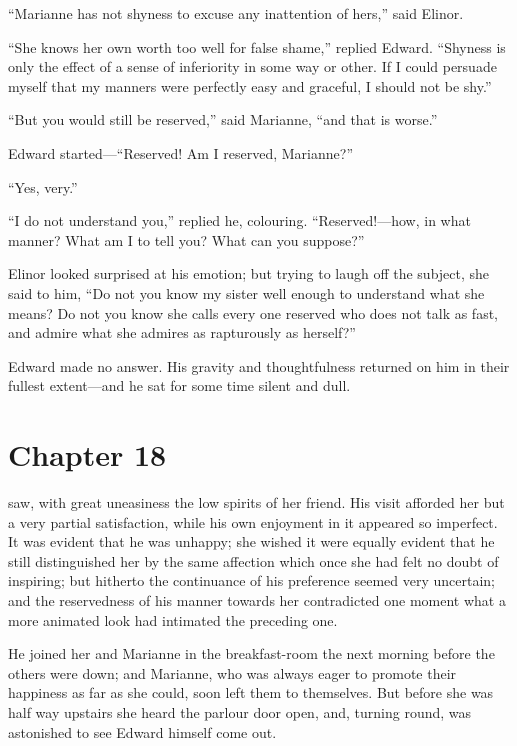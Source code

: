 ``Marianne has not shyness to excuse any inattention
of hers,'' said Elinor.

``She knows her own worth too well for false shame,''
replied Edward.  ``Shyness is only the effect of a sense
of inferiority in some way or other.  If I could persuade
myself that my manners were perfectly easy and graceful,
I should not be shy.''

``But you would still be reserved,'' said Marianne,
``and that is worse.''

Edward started---``Reserved! Am I reserved, Marianne?''

``Yes, very.''

``I do not understand you,'' replied he, colouring.
``Reserved!---how, in what manner?  What am I to tell you?
What can you suppose?''

Elinor looked surprised at his emotion; but trying
to laugh off the subject, she said to him, ``Do not you
know my sister well enough to understand what she means?
Do not you know she calls every one reserved who does not
talk as fast, and admire what she admires as rapturously
as herself?''

Edward made no answer.  His gravity and thoughtfulness
returned on him in their fullest extent---and he sat
for some time silent and dull.



\chapter{Chapter 18}


 saw, with great uneasiness the low spirits
of her friend.  His visit afforded her but a very
partial satisfaction, while his own enjoyment in it
appeared so imperfect.  It was evident that he was unhappy;
she wished it were equally evident that he still
distinguished her by the same affection which once
she had felt no doubt of inspiring; but hitherto the
continuance of his preference seemed very uncertain;
and the reservedness of his manner towards her contradicted
one moment what a more animated look had intimated the preceding
one.

He joined her and Marianne in the breakfast-room
the next morning before the others were down; and Marianne,
who was always eager to promote their happiness as far
as she could, soon left them to themselves.  But before she
was half way upstairs she heard the parlour door open, and,
turning round, was astonished to see Edward himself come out.

